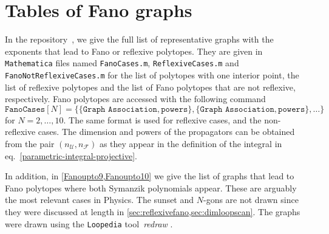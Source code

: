\documentclass[12pt,a4paper]{article}
\theoremstyle{plain}
\theoremstyle{remark}
\newcommand{\nprops}{N}
\newcommand{\cU}{\mathscr {U}}
\newcommand{\cF}{\mathscr {F}}
\begin{document}
    \section{Tables of Fano graphs}
        \label{app:fanotable}

In the repository~\cite{reflexivefano}, we give the full list of representative graphs with the exponents that lead to Fano or reflexive polytopes.
They are given in \texttt{Mathematica} files named \texttt{FanoCases.m}, \texttt{ReflexiveCases.m} and \texttt{FanoNotReflexiveCases.m} for the list of polytopes with one interior point, the list of reflexive polytopes and the list of Fano polytopes that are not reflexive, respectively. Fano polytopes are accessed with the following command 
%
$$ \texttt{FanoCases} [\nprops] = \{ \{\texttt{Graph Association}, \mathtt{powers} \}, \{\texttt{Graph Association},  \mathtt{powers}  \}, \dots \}$$
%
for $\nprops=2,\dots, 10$.  The same format is used for reflexive cases, and the non-reflexive cases.
 The dimension and powers of the propagators can be obtained from the pair $(n_\cU, n_\cF)$ as they appear in the definition of the integral in eq.~\eqref{parametric-integral-projective}. 

 

In addition, in \cref{Fanoupto9,Fanoupto10}  we give the list of graphs that lead to Fano polytopes  where both Symanzik polynomials appear. These are arguably the most relevant cases in Physics. The sunset and $N$-gons are not drawn since they were discussed at length in \cref{sec:reflexivefano,sec:dimloopscan}.  The graphs were drawn using the \texttt{Loopedia} tool~\emph{redraw} \cite{Bogner:2017xhp}.    
%
%
\end{document}
